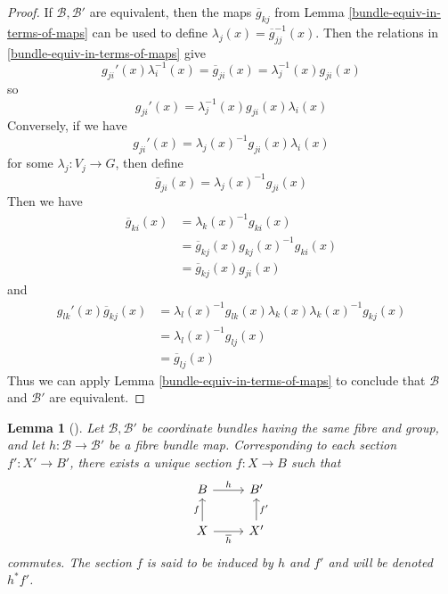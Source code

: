 \documentclass[reqno]{amsart}
\newtheorem{lemma}[theorem]{Lemma}
\theoremstyle{definition}
\theoremstyle{remark}
\begin{document}
\begin{proof}
    If $\mathcal{B},\mathcal{B}'$ are equivalent, then
    the maps $\overline{g}_{kj}$ from Lemma
    \ref{bundle-equiv-in-terms-of-maps} can be used
    to define $\lambda_j (x) = \overline{g}_{jj}^{-1}(x)$.
    Then the relations in \ref{bundle-equiv-in-terms-of-maps}
    give
    \[
    g_{ji}' (x) \lambda_{i}^{-1}(x) = \overline{g}_{ji}(x)
    = \lambda_{j}^{-1}(x) g_{ji}(x)
    \] 
    so
    \[
    g_{ji}'(x) = \lambda_j^{-1}(x) g_{ji}(x) \lambda_i(x)
    \] 
    Conversely, if we have
    \[
    g_{ji}'(x) = \lambda_j(x)^{-1} g_{ji}(x) \lambda_i(x)
    \] 
    for some $\lambda_j \colon V_j \to G$, then
    define
    \[
    \overline{g}_{ji}(x) = \lambda_j(x)^{-1} g_{ji}(x)
    \] 
    Then we have
    \begin{align*}
        \overline{g}_{ki}(x) 
        &=
        \lambda_{k}(x)^{-1} g_{ki}(x)\\
        &= \overline{g}_{kj}(x) g_{kj}(x)^{-1} g_{ki}(x)\\
        &= \overline{g}_{kj}(x) g_{ji}(x)
    \end{align*}
    and
    \begin{align*}
        g_{lk}'(x) \overline{g}_{kj}(x) 
        &= 
    \lambda_{l}(x)^{-1} g_{lk}(x)
    \lambda_k(x) \lambda_k(x)^{-1} g_{kj}(x)\\
        &= \lambda_l(x)^{-1} g_{lj}(x)\\
        &= \overline{g}_{lj}(x)  
    \end{align*}
    Thus we can apply Lemma \ref{bundle-equiv-in-terms-of-maps} 
    to conclude that $\mathcal{B}$ and $\mathcal{B}'$ are
    equivalent.
\end{proof}

\begin{lemma}[]
    Let $\mathcal{B}, \mathcal{B}'$ be coordinate bundles
    having the same fibre and group, and let
    $h \colon \mathcal{B} \to \mathcal{B}'$ be a fibre
    bundle map. Corresponding to each
    section $f' \colon X' \to B'$, there
    exists a unique section
    $f \colon X \to B$ such that
    \begin{equation*}
    \begin{tikzcd}
        B  \ar[r, "h"] & B'  \\
        X \ar[r, "\overline{h}"'] \ar[u, "f"] & X' \ar[u, "f'"']
    \end{tikzcd}
    \end{equation*}
    commutes.
    The section  $f$ is said to be induced by
    $h$ and $f'$ and will be denoted
    $h^{*}f'$.
\end{lemma}
\end{document}
